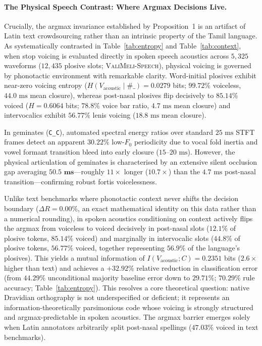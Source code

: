\documentclass[11pt]{article}
\begin{document}
\paragraph{The Physical Speech Contrast: Where Argmax Decisions Live.}
Crucially, the argmax invariance established by Proposition~1 is an artifact of Latin text crowdsourcing rather than an intrinsic property of the Tamil language. As systematically contrasted in Table~\ref{tab:entropy} and Table~\ref{tab:context}, when stop voicing is evaluated directly in spoken speech acoustics across $5{,}325$ waveforms ($12{,}435$ plosive slots; \textsc{ValiMeli-Speech}), physical voicing is governed by phonotactic environment with remarkable clarity. Word-initial plosives exhibit near-zero voicing entropy ($H(V_{\text{acoustic}} \mid \#\_) = \mathbf{0.0279}$ bits; $99.72\%$ voiceless, $44.0\text{ ms}$ mean closure), whereas post-nasal plosives flip decisively to $\mathbf{85.14\%}$ voiced ($H = 0.6064$ bits; $78.8\%$ voice bar ratio, $4.7\text{ ms}$ mean closure) and intervocalics exhibit $56.77\%$ lenis voicing ($18.8\text{ ms}$ mean closure).

In geminates (\texttt{C\_C}), automated spectral energy ratios over standard $25\text{ ms}$ STFT frames detect an apparent $30.22\%$ low-$F_0$ periodicity due to vocal fold inertia and vowel formant transition bleed into early closure ($15$--$20\text{ ms}$). However, the physical articulation of geminates is characterised by an extensive silent occlusion gap averaging $\mathbf{50.5\text{ ms}}$---roughly $11\times$ longer ($10.7\times$) than the $4.7\text{ ms}$ post-nasal transition---confirming robust fortis voicelessness.

Unlike text benchmarks where phonotactic context never shifts the decision boundary ($\Delta R = 0.00\%$, an exact mathematical identity on this data rather than a numerical rounding), in spoken acoustics conditioning on context actively flips the argmax from voiceless to voiced decisively in post-nasal slots ($12.1\%$ of plosive tokens, $85.14\%$ voiced) and marginally in intervocalic slots ($44.8\%$ of plosive tokens, $56.77\%$ voiced, together representing $56.9\%$ of the language's plosives). This yields a mutual information of $I(V_{\text{acoustic}}; C) = \mathbf{0.2351}$ bits ($2.6\times$ higher than text) and achieves a $\mathbf{+32.92\%}$ relative reduction in classification error (from $44.29\%$ unconditional majority baseline error down to $29.71\%$; $70.29\%$ rule accuracy; Table~\ref{tab:entropy}). This resolves a core theoretical question: native Dravidian orthography is not underspecified or deficient; it represents an information-theoretically parsimonious code whose voicing is strongly structured and argmax-predictable in spoken acoustics. The argmax barrier emerges solely when Latin annotators arbitrarily split post-nasal spellings ($47.03\%$ voiced in text benchmarks).
\end{document}
